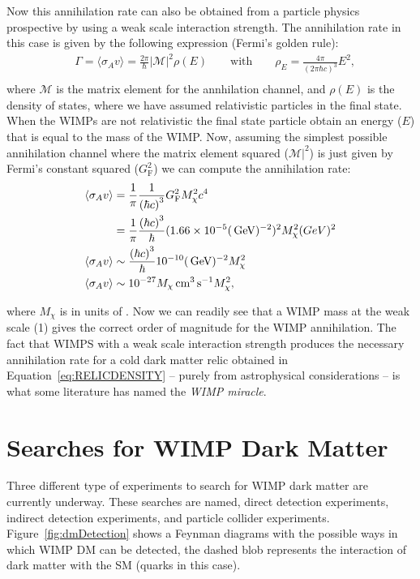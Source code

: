 Now this annihilation rate can also be obtained from a particle
physics prospective by using a weak scale interaction strength. The
annihilation rate in this case is given by the following expression
(Fermi's golden rule):
\begin{equation}
\label{eq:FERMIGL}
\begin{aligned}
       &
\Gamma = \langle \sigma_{A}v\rangle = \frac{2\pi}{\hbar}|\mathcal{M}|^{2}\rho(E)
\qquad \text{with} \qquad \rho_{E} = \frac{4\pi}{\left(2\pi\hbar c\right)^{3}}E^{2},\\
\end{aligned}
\end{equation}
where $\mathcal{M}$ is the matrix element for the annhilation channel,
and $\rho(E)$ is the density of states, where we have assumed
relativistic particles in the final state. When the WIMPs are not
relativistic the final state particle obtain an energy ($E$) that is
equal to the mass of the WIMP. Now, assuming the simplest possible
annihilation channel where the matrix element squared
($\mathcal{M}|^{2}$) is just given by Fermi's constant squared
($G^{2}_{\mathrm{F}}$) we can compute the annihilation rate:
\begin{equation}
\label{eq:FERMIGL}
\begin{aligned}
      \langle \sigma_{A}v\rangle &
= \frac{1}{\pi}\frac{1}{\left(\hbar
    c\right)^{3}}G^{2}_{\mathrm{F}} M^{2}_{\chi}c^{4}\\
&
 = \frac{1}{\pi}\frac{\left(\hbar
    c\right)^{3}}{\hbar}(1.66\times 10^{-5}(\,\text{Ge\hspace{-.08em}V})^{-2})^{2}
M^{2}_{\chi} (GeV)^{2}\\
 \langle \sigma_{A}v\rangle&\sim \frac{\left(\hbar
    c\right)^{3}}{\hbar} 10^{-10}(\,\text{Ge\hspace{-.08em}V})^{-2}
M^{2}_{\chi}\\
\langle \sigma_{A}v\rangle&\sim  10^{-27} M_{\chi}\text{\,cm}^{3}\text{\,s}^{-1}
M^{2}_{\chi},\\
\end{aligned}
\end{equation}

where $M_{\chi}$ is in units of \GeV. Now we can readily see that a
WIMP mass at the weak scale (1\TeV) gives the correct order of
magnitude for the WIMP annihilation. The fact that WIMPS with a weak
scale interaction strength produces the necessary annihilation rate for a cold dark
matter relic obtained in Equation~\ref{eq:RELICDENSITY} -- purely from
astrophysical considerations -- is what some literature has named the
\textit{WIMP miracle}. 
\section{Searches for WIMP Dark Matter}
Three different type of experiments to search for WIMP dark matter are currently
underway. These searches are named, direct detection experiments,
indirect detection experiments, and particle collider
experiments. Figure~\ref{fig:dmDetection} shows a Feynman diagrams
with the possible ways in which WIMP DM can be detected, the dashed
blob represents the interaction of dark matter with the SM (quarks in
this case).


